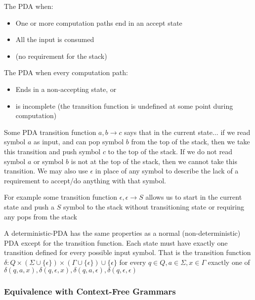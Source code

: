 \documentclass{article}
\begin{document}
The PDA  when:
\begin{itemize}
  \item One or more computation paths end in an accept state 
  \item All the input is consumed 
  \item (no requirement for the stack)
\end{itemize}
The PDA  when every computation path: 
\begin{itemize}
  \item Ends in a non-accepting state, or
  \item is incomplete (the transition function is undefined at some point during computation)
\end{itemize}

\begin{remark}
  Some PDA transition function $a,b \rightarrow c$ says that in the current state$\dots$ if we read symbol $a$ as input, and can pop symbol $b$ from the top of the stack, then we take this transition and push symbol $c$ to the top of the stack. If we do not read symbol $a$ or symbol $b$ is not at the top of the stack, then we cannot take this transition. We may also use $\epsilon$ in place of any symbol to describe the lack of a requirement to accept/do anything with that symbol.
\end{remark}

\begin{example}
  For example some transition function $\epsilon , \epsilon \rightarrow S$ allows us to start in the current state and push a $S$ symbol to the stack without transitioning state or requiring any pops from the stack
\end{example}

\begin{definition}
  A deterministic-PDA has the same properties as a normal (non-deterministic) PDA except for the transition function. Each state must have exactly one transition defined for every possible input symbol. That is the transition function $\delta: Q \times (\Sigma \cup \{\epsilon\}) \times (\Gamma \cup \{\epsilon\}) \cup \{\epsilon\}$ for every $q \in Q, a \in \Sigma, x \in \Gamma$ exactly one of $\delta(q,a,x), \delta(q,\epsilon,x), \delta(q,a,\epsilon), \delta(q,\epsilon,\epsilon)$
\end{definition}

\subsubsection{Equivalence with Context-Free Grammars}
\end{document}
